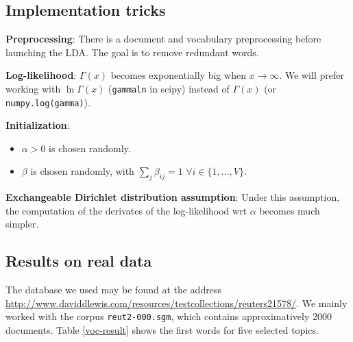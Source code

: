 \documentclass{article}
\begin{document}
\subsection{Implementation tricks}


\textbf{Preprocessing}: There is a document and vocabulary preprocessing before launching the LDA. The goal is to remove redundant words.

\textbf{Log-likelihood}: $\Gamma(x)$ becomes exponentially big when $x \rightarrow \infty$. We will prefer working with $\ln \Gamma(x)$ (\texttt{gammaln} in scipy) instead of $\Gamma(x)$ (or \texttt{numpy.log(gamma)}).

\textbf{Initialization}:
\begin{itemize}
\setlength\itemsep{-0.2em}
  \item $\alpha> 0$ is chosen randomly. %
  \item $\beta$ is chosen randomly, with $\sum_{j} \beta_{ij} = 1$ $\forall i \in \{1, \ldots, V\}$.
\end{itemize}

\textbf{Exchangeable Dirichlet distribution assumption}: Under this assumption, the computation of the derivates of the log-likelihood wrt $\alpha$ becomes much simpler.

\subsection{Results on real data}

The database we used may be found at the address \url{http://www.daviddlewis.com/resources/testcollections/reuters21578/}. We mainly worked with the corpus \texttt{reut2-000.sgm}, which contains approximatively 2000 documents. Table \ref{voc-result} shows the first words for five selected topics.
\end{document}
